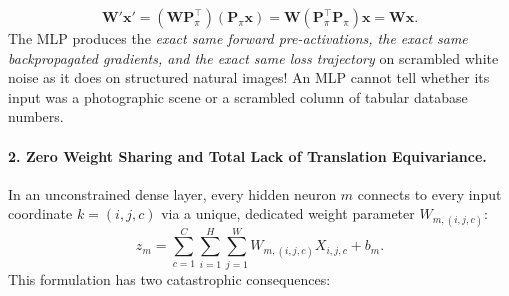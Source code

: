 \begin{itemize}[leftmargin=*]
  \begin{equation}
  \mathbf{W}' \mathbf{x}' = (\mathbf{W}\mathbf{P}_\pi^\top)(\mathbf{P}_\pi \mathbf{x}) = \mathbf{W}(\mathbf{P}_\pi^\top \mathbf{P}_\pi)\mathbf{x} = \mathbf{W}\mathbf{x}.
  \end{equation}
  The MLP produces the \textit{exact same forward pre-activations, the exact same backpropagated gradients, and the exact same loss trajectory} on scrambled white noise as it does on structured natural images! An MLP cannot tell whether its input was a photographic scene or a scrambled column of tabular database numbers.
\end{itemize}

\paragraph{2. Zero Weight Sharing and Total Lack of Translation Equivariance.}
In an unconstrained dense layer, every hidden neuron $m$ connects to every input coordinate $k = (i, j, c)$ via a unique, dedicated weight parameter $W_{m, (i, j, c)}$:
\begin{equation}
z_m = \sum_{c=1}^C \sum_{i=1}^H \sum_{j=1}^W W_{m, (i, j, c)} X_{i, j, c} + b_m.
\label{eq:dense_coordinate_binding}
\end{equation}
This formulation has two catastrophic consequences:
